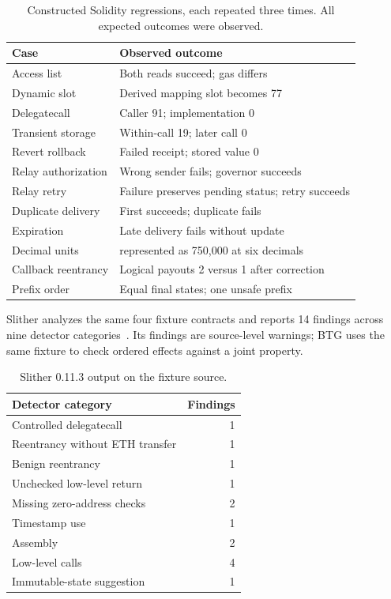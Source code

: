 \begin{table}[t]
\centering\small
\caption{Constructed Solidity regressions, each repeated three times. All
expected outcomes were observed.}
\label{tab:evm}
\begin{tabular}{@{}>{\raggedright\arraybackslash}p{}>{\raggedright\arraybackslash}p{}@{}}
\toprule
Case & Observed outcome\\
\midrule
Access list & Both reads succeed; gas differs\\
Dynamic slot & Derived mapping slot becomes 77\\
Delegatecall & Caller 91; implementation 0\\
Transient storage & Within-call 19; later call 0\\
Revert rollback & Failed receipt; stored value 0\\
Relay authorization & Wrong sender fails; governor succeeds\\
Relay retry & Failure preserves pending status; retry succeeds\\
Duplicate delivery & First succeeds; duplicate fails\\
Expiration & Late delivery fails without update\\
Decimal units & 0.75 represented as 750,000 at six decimals\\
Callback reentrancy & Logical payouts 2 versus 1 after correction\\
Prefix order & Equal final states; one unsafe prefix\\
\bottomrule
\end{tabular}
\end{table}

Slither analyzes the same four fixture contracts and reports 14 findings across
nine detector categories~\cite{feist2019slither,slitherrepo}. Its findings are
source-level warnings; BTG uses the same fixture to check ordered effects
against a joint property.

\begin{table}[t]
\centering\small
\caption{Slither 0.11.3 output on the fixture source.}
\label{tab:slither}
\begin{tabular}{@{}lr@{}}\toprule
Detector category & Findings\\\midrule
Controlled delegatecall & 1\\
Reentrancy without ETH transfer & 1\\
Benign reentrancy & 1\\
Unchecked low-level return & 1\\
Missing zero-address checks & 2\\
Timestamp use & 1\\
Assembly & 2\\
Low-level calls & 4\\
Immutable-state suggestion & 1\\
\bottomrule\end{tabular}
\end{table}

